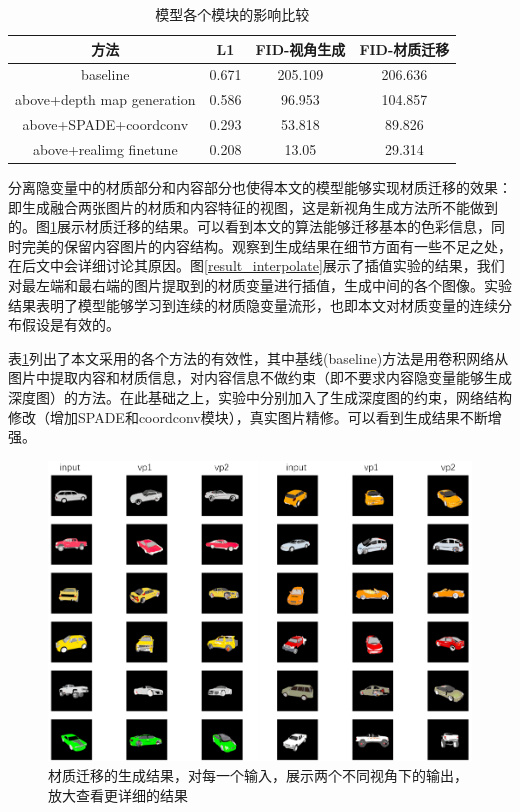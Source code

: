 \documentclass[UTF8,openany,AutoFakeBold,AutoFakeSlant,cs4size]{ctexbook}
\begin{document}
\begin{table}[h]
\small %
\centering
\caption{模型各个模块的影响比较}
\label{ablation_study}
\begin{tabular}{cccc} %
\toprule %
方法 & L1 & FID-视角生成 & FID-材质迁移 \\
\midrule
baseline & 0.671 & 205.109 & 206.636 \\
above+depth map generation & 0.586 & 96.953 & 104.857 \\
above+SPADE+coordconv & 0.293 & 53.818 & 89.826 \\
above+realimg finetune & 0.208 & 13.05 & 29.314 \\
\bottomrule
\end{tabular}
\end{table}

分离隐变量中的材质部分和内容部分也使得本文的模型能够实现材质迁移的效果：即生成融合两张图片的材质和内容特征的视图，这是新视角生成方法所不能做到的。图\ref{result_styletrans}展示材质迁移的结果。可以看到本文的算法能够迁移基本的色彩信息，同时完美的保留内容图片的内容结构。观察到生成结果在细节方面有一些不足之处，在后文中会详细讨论其原因。图\ref{result_interpolate}展示了插值实验的结果，我们对最左端和最右端的图片提取到的材质变量进行插值，生成中间的各个图像。实验结果表明了模型能够学习到连续的材质隐变量流形，也即本文对材质变量的连续分布假设是有效的。

表\ref{ablation_study}列出了本文采用的各个方法的有效性，其中基线(baseline)方法是用卷积网络从图片中提取内容和材质信息，对内容信息不做约束（即不要求内容隐变量能够生成深度图）的方法。在此基础之上，实验中分别加入了生成深度图的约束，网络结构修改（增加SPADE和coordconv模块），真实图片精修。可以看到生成结果不断增强。

\begin{figure}
\centering
\includegraphics[width=\linewidth]{./images/style_transfer_thesis.png}
\caption{材质迁移的生成结果，对每一个输入，展示两个不同视角下的输出，放大查看更详细的结果}
\label{result_styletrans}
\end{figure}
\end{document}
